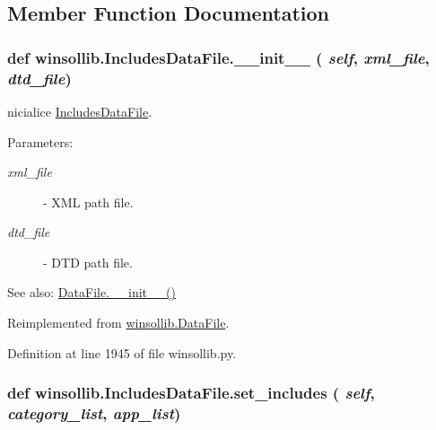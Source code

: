 \subsection{Member Function Documentation}
\hypertarget{classwinsollib_1_1IncludesDataFile_64deea7da911c3fb099dee54eb1f6cf9}{
\subsubsection[\_\-\_\-init\_\-\_\-]{\setlength{\rightskip}{0pt plus 5cm}def winsollib.Includes\-Data\-File.\_\-\_\-init\_\-\_\- ( {\em self},  {\em xml\_\-file},  {\em dtd\_\-file})}}
\label{classwinsollib_1_1IncludesDataFile_64deea7da911c3fb099dee54eb1f6cf9}


nicialice \hyperlink{classwinsollib_1_1IncludesDataFile}{Includes\-Data\-File}. 

\begin{Desc}
\item[Parameters:]
\begin{description}
\item[{\em xml\_\-file}]- XML path file. \item[{\em dtd\_\-file}]- DTD path file.\end{description}
\end{Desc}
\begin{Desc}
\item[See also:]\hyperlink{classwinsollib_1_1DataFile_22c2b3c07b3991b6c2300719eccd9687}{Data\-File.\_\-\_\-init\_\-\_\-()} \end{Desc}


Reimplemented from \hyperlink{classwinsollib_1_1DataFile_22c2b3c07b3991b6c2300719eccd9687}{winsollib.Data\-File}.

Definition at line 1945 of file winsollib.py.\hypertarget{classwinsollib_1_1IncludesDataFile_f3fc71443476782ede889658ad70ef1f}{
\subsubsection[set\_\-includes]{\setlength{\rightskip}{0pt plus 5cm}def winsollib.Includes\-Data\-File.set\_\-includes ( {\em self},  {\em category\_\-list},  {\em app\_\-list})}}
\label{classwinsollib_1_1IncludesDataFile_f3fc71443476782ede889658ad70ef1f}


